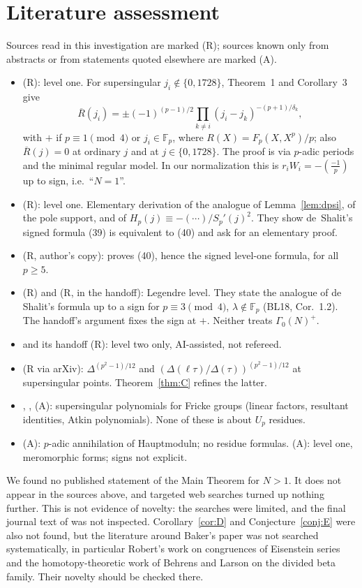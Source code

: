 \documentclass[11pt,a4paper]{article}
\numberwithin{equation}{section}
\theoremstyle{definition}
\theoremstyle{remark}
\newcommand{\Fp}{\mathbb F_p}
\newcommand{\Lp}[1]{\left(\frac{#1}{p}\right)}
\begin{document}
\section{Literature assessment}\label{sec:lit}
Sources read in this investigation are marked (R); sources known only from abstracts or from
statements quoted elsewhere are marked (A).
\begin{itemize}
\item \citet{dS94} (R): level one. For supersingular $j_i\notin\{0,1728\}$, Theorem~1 and Corollary~3 give
\[
\overline R(j_i)=\pm(-1)^{(p-1)/2}\prod_{k\ne i}(j_i-j_k)^{-(p+1)/\delta_k},
\]
with $+$ if $p\equiv1\pmod4$ or $j_i\in\Fp$, where $R(X)=F_p(X,X^p)/p$; also
$\overline R(j)=0$ at ordinary $j$ and at $j\in\{0,1728\}$. The proof is via $p$-adic periods and the minimal regular model. In our
normalization this is $r_iW_i=-\Lp{-1}$ up to sign, i.e.\ ``$N=1$''.
\item \citet[\S10]{KZ98} (R): level one. Elementary derivation of the analogue of Lemma~\ref{lem:dpsi},
of the pole support, and of $H_p(j)\equiv-(\cdots)/S_p'(j)^2$. They show de~Shalit's signed formula
(39) is equivalent to (40) and ask for an elementary proof.
\item \citet{Baker98} (R, author's copy): proves (40), hence the signed level-one formula, for all $p\ge5$.
\item \citet{BLpre} (R) and \citet{BL18} (R, in the handoff): Legendre level. They state the analogue of de Shalit's formula
up to a sign for $p\equiv3\pmod4$, $\lambda\notin\Fp$ (BL18, Cor.~1.2). The handoff's argument fixes
the sign at $+$. Neither treats $\Gamma_0(N)^+$.
\item \citet{Jordan26} and its handoff (R): level two only, AI-assisted, not refereed.
\item \citet{Ono25} (R via arXiv): $\Delta^{(p^2-1)/12}$ and $(\Delta(\ell\tau)/\Delta(\tau))^{(p^2-1)/12}$ at
supersingular points. Theorem~\ref{thm:C} refines the latter.
\item \citet{Morton21}, \citet{Nakaya19}, \citet{Sakai11} (A): supersingular polynomials for Fricke
groups (linear factors, resultant identities, Atkin polynomials). None of these is about $U_p$ residues.
\item \citet{CMT19} (A): $p$-adic annihilation of Hauptmoduln; no residue formulas. \citet{BGKMR26}
(A): level one, meromorphic forms; signs not explicit.
\end{itemize}
We found no published statement of the Main Theorem for $N>1$. It does not appear in the sources above, and
targeted web searches turned up nothing further. This is not evidence of novelty: the searches were limited, and the final
journal text of \citet{BLtams} was not inspected. Corollary~\ref{cor:D} and
Conjecture~\ref{conj:E} were also not found, but the literature around Baker's paper was not searched systematically,
in particular Robert's work on congruences of Eisenstein series and the homotopy-theoretic work of Behrens and Larson
on the divided beta family. Their novelty should be checked there.
\end{document}
